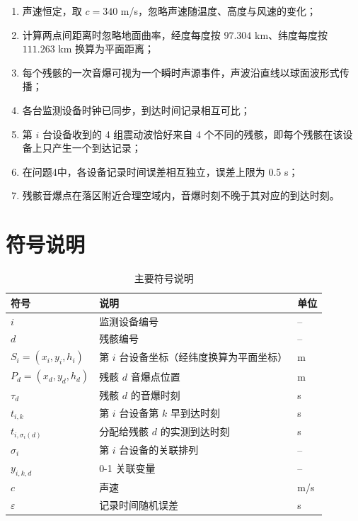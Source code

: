 \documentclass[12pt,a4paper]{article}
\newcommand{\tip}[1]{\par\noindent\textbf{【提示】} #1\par}
\newcommand{\warning}[1]{\par\noindent\textbf{【高频失分点】} #1\par}
\begin{document}

\begin{enumerate}[label=(\arabic*)]
  \item 声速恒定，取 $c=340$ m/s，忽略声速随温度、高度与风速的变化；
  \item 计算两点间距离时忽略地面曲率，经度每度按 $97.304$ km、纬度每度按 $111.263$ km 换算为平面距离；
  \item 每个残骸的一次音爆可视为一个瞬时声源事件，声波沿直线以球面波形式传播；
  \item 各台监测设备时钟已同步，到达时间记录相互可比；
  \item 第 $i$ 台设备收到的 4 组震动波恰好来自 4 个不同的残骸，即每个残骸在该设备上只产生一个到达记录；
  \item 在问题4中，各设备记录时间误差相互独立，误差上限为 0.5 s；
  \item 残骸音爆点在落区附近合理空域内，音爆时刻不晚于其对应的到达时刻。
\end{enumerate}

\section{符号说明}


\begin{table}[H]
\centering
\caption{主要符号说明}
\label{tab:symbol}
\begin{tabular}{p{3cm}p{8cm}p{2cm}}
\toprule
符号 & 说明 & 单位\\
\midrule
$i$ & 监测设备编号 & -- \\
$d$ & 残骸编号 & -- \\
$S_i=(x_i,y_i,h_i)$ & 第 $i$ 台设备坐标（经纬度换算为平面坐标） & m \\
$P_d=(x_d,y_d,h_d)$ & 残骸 $d$ 音爆点位置 & m \\
$\tau_d$ & 残骸 $d$ 的音爆时刻 & s \\
$t_{i,k}$ & 第 $i$ 台设备第 $k$ 早到达时刻 & s \\
$t_{i,\sigma_i(d)}$ & 分配给残骸 $d$ 的实测到达时刻 & s \\
$\sigma_i$ & 第 $i$ 台设备的关联排列 & -- \\
$y_{i,k,d}$ & 0-1 关联变量 & -- \\
$c$ & 声速 & m/s \\
$\varepsilon$ & 记录时间随机误差 & s \\
\bottomrule
\end{tabular}
\end{table}
\end{document}
